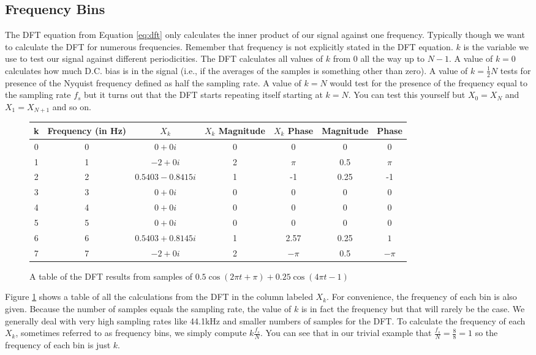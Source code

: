 \subsection*{Frequency Bins}

The DFT equation from Equation \ref{eq:dft} only calculates the inner product of our signal against one
frequency.  Typically though we want to calculate the DFT for numerous frequencies.  Remember that
frequency is not explicitly stated in the DFT equation.  $k$ is the variable we use to test our signal against
different periodicities.  The DFT calculates all values of $k$ from 0 all the way up to $N - 1$.  A value of $k = 0$
calculates how much D.C. bias is in the signal (i.e., if the averages of the samples is something other than zero).
A value of $k = \frac{1}{2}N$ tests for presence of the Nyquist frequency defined as half the sampling rate.  
A value of $k = N$ would test for the 
presence of the frequency equal to the sampling rate $f_s$ but it turns out that the DFT starts repeating itself
starting at $k = N$.  You can test this yourself but $X_0 = X_N$ and $X_1 = X_{N + 1}$ and so on.

\begin{figure}[h]
	\caption{A table of the DFT results from samples of $0.5\cos(2\pi t + \pi) + 0.25\cos(4\pi t - 1)$}
	\label{fig:dftTable}
	\begin{center}
		\begin{tabular}{ |c|c|c|c|c|c|c| } 
			\hline
			k & Frequency (in Hz) & $X_k$ & $X_k$ Magnitude & $X_k$ Phase & Magnitude & Phase \\ 
			\hline
			0 & 0 & $0 + 0i$ & 0 & 0 & 0 & 0 \\ 
			1 & 1 & $-2 + 0i$ & 2 & $\pi$& 0.5 & $\pi$ \\
			2 & 2 & $0.5403 - 0.8415i$ & 1 & -1 &0.25 & -1 \\
			3 & 3 & $0 + 0i$ & 0 & 0 & 0 & 0 \\
			4 & 4 & $0 + 0i$ & 0 & 0 & 0 & 0 \\
			5 & 5 & $0 + 0i$ & 0 & 0 & 0 & 0 \\
			6 & 6 & $0.5403 + 0.8145i$ & 1 & 2.57 & 0.25 & $1$ \\
			7 & 7 & $-2 + 0i$ & 2 & $-\pi$ & 0.5 & $-\pi$ \\
			\hline
		\end{tabular}
	\end{center}
	
\end{figure}

Figure \ref{fig:dftTable} shows a table of all the calculations from the DFT in the column labeled $X_k$.  For
convenience, the frequency of each bin is also given.  Because the number of samples equals the sampling rate,
the value of $k$ is in fact the frequency but that will rarely be the case.  We generally deal with very high
sampling rates like 44.1kHz and smaller numbers of samples for the DFT.  To calculate the frequency of each
$X_k$, sometimes referred to as frequency bins, we simply compute $k\frac{f_s}{N}$.  You can see that in
our trivial example that $\frac{f_s}{N} = \frac{8}{8} = 1$ so the frequency of each bin is just $k$.

